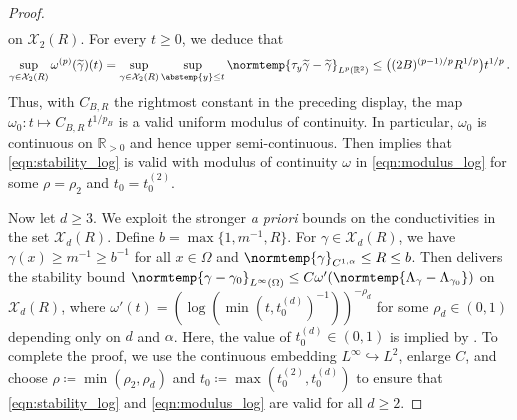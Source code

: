 \documentclass[pdflatex,sn-mathphys-num]{sn-jnl-preprint}
\newcommand{\R}{\mathbb{R}}
\newcommand{\cX}{\mathcal{X}}
\newcommand{\dtn}{\Lambda_{\gamma}}
\newcommand{\dtnz}{\Lambda_{\gamma_0}}
\newcommand{\norm}{\normtemp}
\newcommand{\abs}{\abstemp}
\newcommand{\defeq}{\coloneqq} %
\newcommand{\al}{\alpha}
\theoremstyle{thmstyleone}%
\theoremstyle{thmstyletwo}%
\theoremstyle{thmstylethree}%
\numberwithin{equation}{section}
\numberwithin{theorem}{section}
\begin{document}
\begin{proof}
\begin{align*}
    \end{align*}
    on $\cX_2(R)$. For every $t\geq 0$, we deduce that
    \begin{align*}
        \sup_{\gamma\in\cX_2(R)} \omega^{(p)}(\widetilde{\gamma})(t)=\sup_{\gamma\in\cX_2(R)} \sup_{\abs{y}\leq t}\norm{\tau_y \widetilde{\gamma} - \widetilde{\gamma}}_{L^{p}(\R^2)}\leq \bigl((2B)^{(p-1)/p}R^{1/p}\bigr) t^{1/p}\,.
    \end{align*}
    Thus, with $C_{B,R}$ the rightmost constant in the preceding display, 
    the map $\omega_0\colon t\mapsto C_{B,R}\, t^{1/p_B}$ is a valid uniform modulus of continuity. In particular, $\omega_0$ is continuous on $\R_{>0}$ and hence upper semi-continuous. Then \cite[p.~5662]{faraco2018characterization} implies that \eqref{eqn:stability_log} is valid with modulus of continuity $\omega$ in \eqref{eqn:modulus_log} for some $\rho=\rho_2$ and $t_0=t_0^{(2)}$.

    Now let $d\geq 3$. We exploit the stronger \emph{a priori} bounds on the conductivities in the set $\cX_d(R)$. Define $b=\max\{1, m^{-1}, R\}$. For $\gamma\in\cX_d(R)$, we have $\gamma(x)\geq m^{-1}\geq b^{-1}$ for all $x\in \Omega$ and $\norm{\gamma}_{C^{1,\al}}\leq R\leq b$. Then \cite[Thm.~1.1, p.~470]{caro2013stability} delivers the stability bound $\norm{\gamma-\gamma_0}_{L^\infty(\Omega)} \leq C \omega'(\norm{\dtn - \dtnz})$ on $\cX_d(R)$, where $\omega'(t)=(\log(\min(t, t_0^{(d)})^{-1}))^{-\rho_d}$ for some $\rho_d\in(0,1)$ depending only on $d$ and $\al$. Here, the value of $t_0^{(d)}\in(0,1)$ is implied by \cite[pp.~489--490]{caro2013stability}. To complete the proof, we use the continuous embedding $L^\infty\hookrightarrow L^2$, enlarge $C$, and choose $\rho\defeq \min(\rho_2,\rho_d)$ and $t_0\defeq \max(t_0^{(2)}, t_0^{(d)})$ to ensure that \eqref{eqn:stability_log} and \eqref{eqn:modulus_log} are valid for all $d\geq 2$.
\end{proof}
\end{document}
